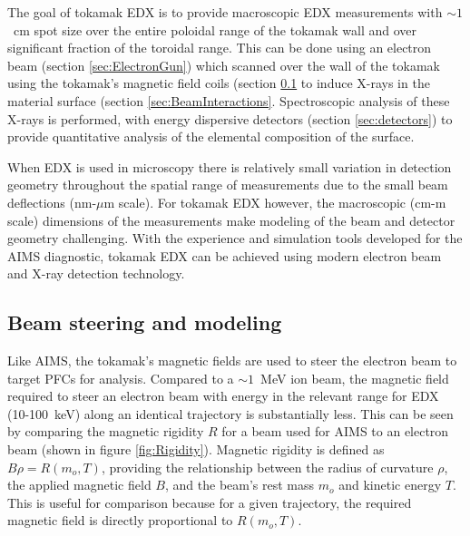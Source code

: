 \documentclass[12pt,letterpaper,final]{article}
\begin{document}
The goal of tokamak EDX is to provide macroscopic EDX measurements with $\sim1$~cm spot size over the entire poloidal range of the tokamak wall and over significant fraction of the toroidal range. This can be done using an electron beam (section \ref{sec:ElectronGun}) which scanned over the wall of the tokamak using the tokamak's magnetic field coils (section \ref{sec:BeamSteering} to induce X-rays in the material surface (section \ref{sec:BeamInteractions}. Spectroscopic analysis of these X-rays is performed, with energy dispersive detectors (section \ref{sec:detectors}) to provide quantitative analysis of the elemental composition of the surface. 

When EDX is used in microscopy there is relatively small variation in detection geometry throughout the spatial range of measurements due to the small beam deflections (nm-$\mu$m scale). For tokamak EDX however, the macroscopic (cm-m scale) dimensions of the measurements make modeling of the beam and detector geometry challenging. With the experience and simulation tools developed for the AIMS diagnostic, tokamak EDX can be achieved using modern electron beam and X-ray detection technology.

\subsection{Beam steering and modeling}
\label{sec:BeamSteering}
Like AIMS, the tokamak's magnetic fields are used to steer the electron beam to target PFCs for analysis. Compared to a $\sim 1$~MeV ion beam, the magnetic field required to steer an electron beam with energy in the relevant range for EDX (10-100~keV) along an identical trajectory is substantially less. This can be seen by comparing the magnetic rigidity $R$ for a beam used for AIMS to an electron beam (shown in figure \ref{fig:Rigidity}). Magnetic rigidity is defined as $B\rho = R(m_o,T)$, providing the relationship between the radius of curvature $\rho$, the applied magnetic field $B$, and the beam's rest mass $m_o$ and kinetic energy $T$. This is useful for comparison because for a given trajectory, the required magnetic field is directly proportional to $R(m_o,T)$.
\end{document}
